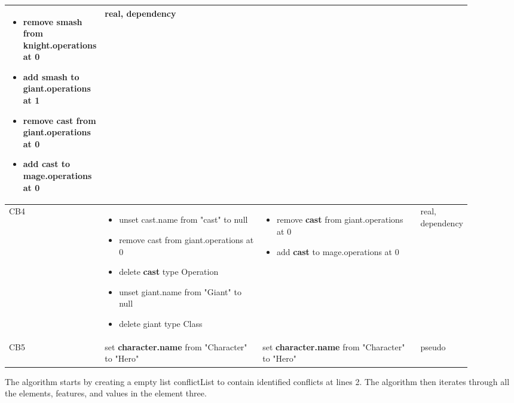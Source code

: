 \begin{table}[ht]
\begin{tabular}{|p{0.04\linewidth}|p{0.4\linewidth}|p{0.4\linewidth}|
        p{0.06\linewidth}|}
\begin{minipage}[t]{\linewidth}
\begin{itemize}[leftmargin=0pt]
          \setlength
          \item[] remove smash from knight.operations at 0
          \item[] add smash to \textbf{giant}.operations at 1
          \item[] remove cast from \textbf{giant}.operations at 0
          \item[] add cast to mage.operations at 0
        \end{itemize}
      \end{minipage}
      & 
      real, dependency\\
      \hline
      CB4 & 
      \begin{minipage}[t]{\linewidth}
        \raggedright
        \begin{itemize}[leftmargin=0pt]
          \setlength
          \item[] unset cast.name from "cast" to null
          \item[] remove cast from giant.operations at 0
          \item[] delete \textbf{cast} type Operation
          \item[] unset giant.name from "Giant" to null
          \item[] delete giant type Class
        \end{itemize}
      \end{minipage}
      & 
      \begin{minipage}[t]{\linewidth}
        \raggedright
        \begin{itemize}[leftmargin=0pt]
          \setlength
          \item[] remove \textbf{cast} from giant.operations at 0
          \item[] add \textbf{cast} to mage.operations at 0
        \end{itemize}
      \end{minipage}
      & 
      real, dependency\\
      \hline
      CB5 & 
      set \textbf{character.name} from "Character" to "Hero" & 
      set \textbf{character.name} from "Character" to "Hero" & 
      pseudo\\ 
      \hline
    \end{tabular}
\end{table}


The algorithm starts by creating a empty list \textsf{conflictList} to contain identified conflicts at lines 2. The algorithm then iterates through all the elements, features, and values in the element three. 

